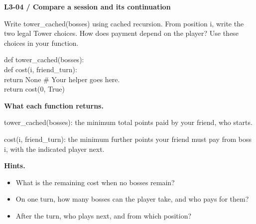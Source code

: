 \documentclass[11pt,a4paper]{article}
\begin{document}
\par\noindent\begin{minipage}{\linewidth}
\textbf{L3-04 / Compare a session and its continuation}\par\smallskip Write tower\_cached(bosses) using cached recursion. From position i, write the two legal Tower choices. How does payment depend on the player? Use these choices in your function.\par
\par{}\par\smallskip\noindent\colorbox{codepaper}{\parbox{\dimexpr\linewidth-2\fboxsep\relax}{\small\ttfamily\raggedright def tower\_cached(bosses):\\\hspace*{2.4em}def cost(i, friend\_turn):\\\hspace*{4.8em}return None  \# Your helper goes here.\\\hspace*{2.4em}return cost(0, True)}}\par
{\small\textbf{What each function returns.}\par tower\_cached(bosses): the minimum total points paid by your friend, who starts.\par cost(i, friend\_turn): the minimum further points your friend must pay from boss i, with the indicated player next.\par }
{\small\textbf{Hints.}}\begin{itemize}\item What is the remaining cost when no bosses remain?\item On one turn, how many bosses can the player take, and who pays for them?\item After the turn, who plays next, and from which position?\end{itemize}
\end{minipage}\par\vspace{4mm}
\end{document}
